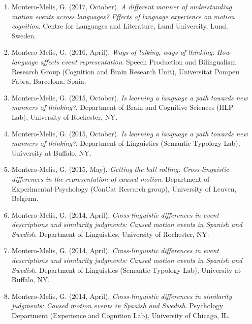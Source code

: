 \documentclass[margin, 11pt]{res} %
\begin{document}
\begin{resume}
\begin{enumerate}
\item Montero-Melis, G. (2017, October). \textit{A different manner of understanding motion events across languages? Effects of language experience on motion cognition}. Centre for Languages and Literature, Lund University, Lund, Sweden.

\item Montero-Melis, G. (2016, April). \textit{Ways of talking, ways of thinking: How language affects event representation}. Speech Production and Bilingualism Research Group (Cognition and Brain Research Unit), Universitat Pompeu Fabra, Barcelona, Spain.

\item Montero-Melis, G. (2015, October). \textit{Is learning a language a path towards new manners of thinking?}. Department of Brain and Cognitive Sciences (HLP Lab), University of Rochester, NY.

\item Montero-Melis, G. (2015, October). \textit{Is learning a language a path towards new manners of thinking?}. Department of Linguistics (Semantic Typology Lab), University at Buffalo, NY.

\item Montero-Melis, G. (2015, May). \textit{Getting the ball rolling: Cross-linguistic differences in the representation of caused motion}. Department of Experimental Psychology (ConCat Research group), University of Leuven, Belgium.

\item Montero-Melis, G. (2014, April). \textit{Cross-linguistic differences in event descriptions and similarity judgments: Caused motion events in Spanish and Swedish}. Department of Linguistics, University of Rochester, NY.

\item Montero-Melis, G. (2014, April). \textit{Cross-linguistic differences in event descriptions and similarity judgments: Caused motion events in Spanish and Swedish}. Department of Linguistics (Semantic Typology Lab), University at Buffalo, NY.

\item Montero-Melis, G. (2014, April). \textit{Cross-linguistic differences in similarity judgments: Caused motion events in Spanish and Swedish}. Psychology Department (Experience and Cognition Lab), University of Chicago, IL.

\end{enumerate}




\end{resume}
\end{document}
